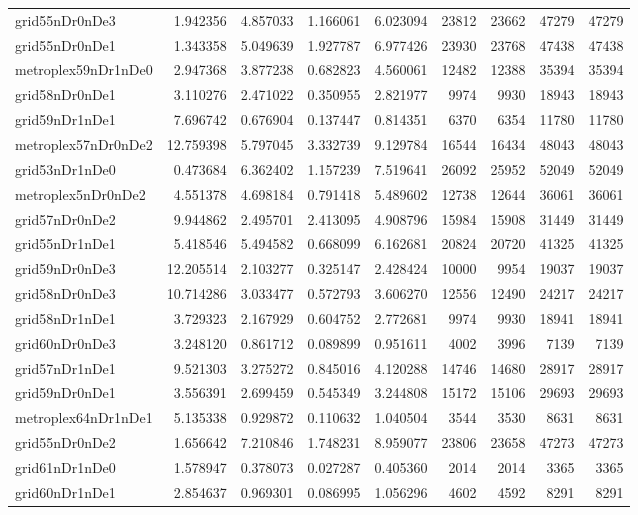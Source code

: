 \begin{longtable}{|l|r|r|r|r|r|r|r|r|}
grid55nDr0nDe3 & 1.942356 & 4.857033 & 1.166061 & 6.023094 & 23812 & 23662 & 47279 & 47279 \\
grid55nDr0nDe1 & 1.343358 & 5.049639 & 1.927787 & 6.977426 & 23930 & 23768 & 47438 & 47438 \\
metroplex59nDr1nDe0 & 2.947368 & 3.877238 & 0.682823 & 4.560061 & 12482 & 12388 & 35394 & 35394 \\
grid58nDr0nDe1 & 3.110276 & 2.471022 & 0.350955 & 2.821977 & 9974 & 9930 & 18943 & 18943 \\
grid59nDr1nDe1 & 7.696742 & 0.676904 & 0.137447 & 0.814351 & 6370 & 6354 & 11780 & 11780 \\
metroplex57nDr0nDe2 & 12.759398 & 5.797045 & 3.332739 & 9.129784 & 16544 & 16434 & 48043 & 48043 \\
grid53nDr1nDe0 & 0.473684 & 6.362402 & 1.157239 & 7.519641 & 26092 & 25952 & 52049 & 52049 \\
metroplex5nDr0nDe2 & 4.551378 & 4.698184 & 0.791418 & 5.489602 & 12738 & 12644 & 36061 & 36061 \\
grid57nDr0nDe2 & 9.944862 & 2.495701 & 2.413095 & 4.908796 & 15984 & 15908 & 31449 & 31449 \\
grid55nDr1nDe1 & 5.418546 & 5.494582 & 0.668099 & 6.162681 & 20824 & 20720 & 41325 & 41325 \\
grid59nDr0nDe3 & 12.205514 & 2.103277 & 0.325147 & 2.428424 & 10000 & 9954 & 19037 & 19037 \\
grid58nDr0nDe3 & 10.714286 & 3.033477 & 0.572793 & 3.606270 & 12556 & 12490 & 24217 & 24217 \\
grid58nDr1nDe1 & 3.729323 & 2.167929 & 0.604752 & 2.772681 & 9974 & 9930 & 18941 & 18941 \\
grid60nDr0nDe3 & 3.248120 & 0.861712 & 0.089899 & 0.951611 & 4002 & 3996 & 7139 & 7139 \\
grid57nDr1nDe1 & 9.521303 & 3.275272 & 0.845016 & 4.120288 & 14746 & 14680 & 28917 & 28917 \\
grid59nDr0nDe1 & 3.556391 & 2.699459 & 0.545349 & 3.244808 & 15172 & 15106 & 29693 & 29693 \\
metroplex64nDr1nDe1 & 5.135338 & 0.929872 & 0.110632 & 1.040504 & 3544 & 3530 & 8631 & 8631 \\
grid55nDr0nDe2 & 1.656642 & 7.210846 & 1.748231 & 8.959077 & 23806 & 23658 & 47273 & 47273 \\
grid61nDr1nDe0 & 1.578947 & 0.378073 & 0.027287 & 0.405360 & 2014 & 2014 & 3365 & 3365 \\
grid60nDr1nDe1 & 2.854637 & 0.969301 & 0.086995 & 1.056296 & 4602 & 4592 & 8291 & 8291 \\

\end{longtable}
